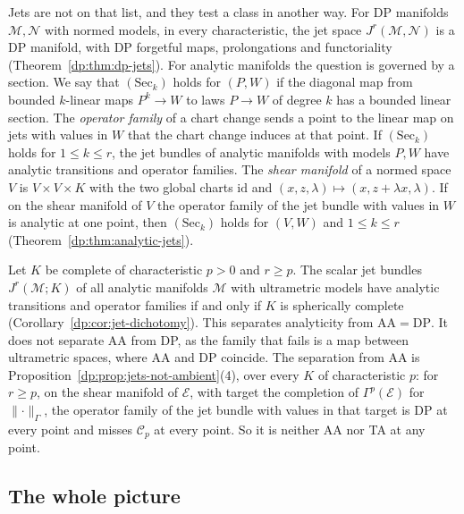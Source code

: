 \documentclass[11pt]{amsart}
\theoremstyle{definition}
\theoremstyle{remark}
\numberwithin{equation}{section}
\newcommand{\id}{\mathrm{id}}
\newcommand{\norm}[1]{\lVert #1\rVert}
\newcommand{\cC}{\mathcal{C}}
\theoremstyle{plain}
\theoremstyle{definition}
\theoremstyle{plain}
\begin{document}
Jets are not on that list, and they test a class in another way. For DP manifolds $\mathcal M,\mathcal N$ with normed models, in every characteristic, the jet space $J^r(\mathcal M,\mathcal N)$ is a DP manifold, with DP forgetful maps, prolongations and functoriality (Theorem~\ref{dp:thm:dp-jets}). For analytic manifolds the question is governed by a section. We say that $(\mathrm{Sec}_k)$ holds for $(P,W)$ if the diagonal map from bounded $k$-linear maps $P^k\to W$ to laws $P\to W$ of degree $k$ has a bounded linear section. The \emph{operator family} of a chart change sends a point to the linear map on jets with values in $W$ that the chart change induces at that point. If $(\mathrm{Sec}_k)$ holds for $1\le k\le r$, the jet bundles of analytic manifolds with models $P,W$ have analytic transitions and operator families. The \emph{shear manifold} of a normed space $V$ is $V\times V\times K$ with the two global charts $\id$ and $(x,z,\lambda)\mapsto(x,z+\lambda x,\lambda)$. If on the shear manifold of $V$ the operator family of the jet bundle with values in $W$ is analytic at one point, then $(\mathrm{Sec}_k)$ holds for $(V,W)$ and $1\le k\le r$ (Theorem~\ref{dp:thm:analytic-jets}).

Let $K$ be complete of characteristic $p>0$ and $r\ge p$. The scalar jet bundles $J^r(\mathcal M;K)$ of all analytic manifolds $\mathcal M$ with ultrametric models have analytic transitions and operator families if and only if $K$ is spherically complete (Corollary~\ref{dp:cor:jet-dichotomy}). This separates analyticity from $\mathrm{AA}=\mathrm{DP}$. It does not separate AA from DP, as the family that fails is a map between ultrametric spaces, where AA and DP coincide. The separation from AA is Proposition~\ref{dp:prop:jets-not-ambient}(4), over every $K$ of characteristic $p$: for $r\ge p$, on the shear manifold of $\mathcal E$, with target the completion of $\Gamma^p(\mathcal E)$ for $\norm\cdot_\Gamma$, the operator family of the jet bundle with values in that target is DP at every point and misses $\cC_p$ at every point. So it is neither AA nor TA at any point.

\subsection*{The whole picture}
\end{document}
